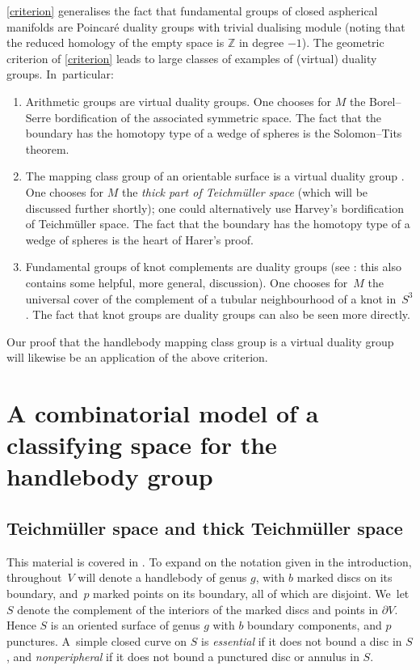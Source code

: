\documentclass[11pt]{article}
\theoremstyle{plain}
\theoremstyle{definition}
\newcommand{\Z}{\mathbb Z}
\begin{document}
\cref{criterion} generalises the fact that fundamental groups of closed aspherical manifolds are Poincaré duality groups with trivial dualising module (noting that the reduced homology of the empty space is $\Z$ in degree $-1$). The geometric criterion of \cref{criterion} leads to large classes of examples of (virtual) duality groups. In~particular:
\begin{enumerate}
\item Arithmetic groups are virtual duality groups. One chooses for $M$ the Borel--Serre bordification \cite{borelserre} of the associated symmetric space. The fact that the boundary has the homotopy type of a wedge of spheres is the Solomon--Tits theorem.
\item The mapping class group of an orientable surface is a virtual duality group \cite{harer,ivanov}. One chooses for $M$ the \emph{thick part of Teichmüller space} (which will be discussed further shortly); one could alternatively use Harvey's bordification of Teichmüller space. The fact that the boundary has the homotopy type of a wedge of spheres is the heart of Harer's proof.
\item Fundamental groups of knot complements are duality groups (see \cite[Ex.\,1 in \S VIII.9]{brown2}: this also contains some helpful, more general, discussion). One chooses for~$M$ the universal cover of the complement of a tubular neighbourhood of a knot in~$S^3$. The fact that knot groups are duality groups can also be seen more directly.
\end{enumerate}

Our proof that the handlebody mapping class group is a virtual duality group will likewise be an application of the above criterion.

\section{A combinatorial model of a classifying space for the handlebody group}

\subsection{Teichmüller space and thick Teichmüller space}

This material is covered in \cite[Ch.\,10]{farbmargalit}. To expand on the notation given in the introduction, throughout~$V$ will denote a handlebody of genus $g$, with $b$ marked discs on its boundary, and~$p$ marked points on its boundary, all of which are disjoint. We~let $S$ denote the complement of the interiors of the marked discs and points in $\partial V$. Hence $S$ is an oriented surface of genus $g$ with $b$ boundary components, and $p$ punctures. A~simple closed curve on $S$ is \emph{essential} if it does not bound a disc in $S$, and \emph{nonperipheral} if it does not bound a punctured disc or annulus in $S$.
\end{document}
